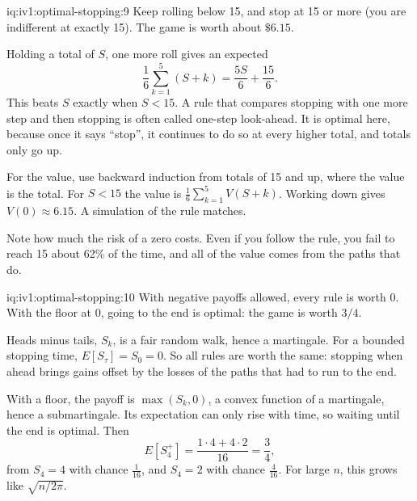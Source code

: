 \begin{solution}{iq:iv1:optimal-stopping:9}
Keep rolling below 15, and stop at 15 or more (you are indifferent at exactly 15). The game is worth about $\$6.15$.

Holding a total of $S$, one more roll gives an expected
\[
\frac16 \sum_{k = 1}^{5} (S + k) = \frac{5S}{6} + \frac{15}{6}.
\]
This beats $S$ exactly when $S < 15$. A rule that compares stopping with one more step and then stopping is often called one-step look-ahead. It is optimal here, because once it says ``stop'', it continues to do so at every higher total, and totals only go up.

For the value, use backward induction from totals of 15 and up, where the value is the total. For $S < 15$ the value is $\frac16\sum_{k = 1}^5 V(S + k)$. Working down gives $V(0) \approx 6.15$. A simulation of the rule matches.

Note how much the risk of a zero costs. Even if you follow the rule, you fail to reach 15 about 62\% of the time, and all of the value comes from the paths that do.

\end{solution}

\begin{solution}{iq:iv1:optimal-stopping:10}
With negative payoffs allowed, every rule is worth 0. With the floor at 0, going to the end is optimal: the game is worth $3/4$.

Heads minus tails, $S_k$, is a fair random walk, hence a martingale. For a bounded stopping time, $E[S_\tau] = S_0 = 0$. So all rules are worth the same: stopping when ahead brings gains offset by the losses of the paths that had to run to the end.

With a floor, the payoff is $\max(S_k, 0)$, a convex function of a martingale, hence a submartingale. Its expectation can only rise with time, so waiting until the end is optimal. Then
\[
E[S_4^+] = \frac{1 \cdot 4 + 4 \cdot 2}{16} = \frac34,
\]
from $S_4 = 4$ with chance $\tfrac{1}{16}$, and $S_4 = 2$ with chance $\tfrac{4}{16}$. For large $n$, this grows like $\sqrt{n/2\pi}$.

\end{solution}

